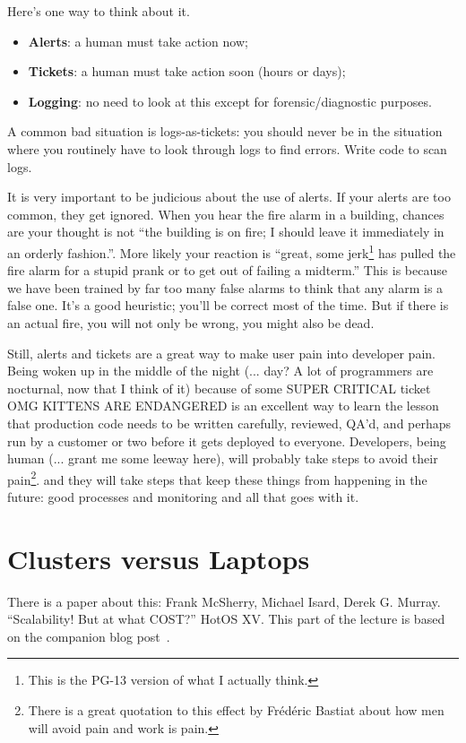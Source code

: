 \documentclass[a4paper]{report}
\begin{document}
Here's one way to think about it. 
\begin{itemize}
\item {\bf Alerts}: a human must take action now;
\item {\bf Tickets}: a human must take action soon (hours or days);
\item {\bf Logging}: no need to look at this except for forensic/diagnostic purposes.
\end{itemize}
A common bad situation is logs-as-tickets: you should never be in the
situation where you routinely have to look through logs to find
errors. Write code to scan logs.

It is very important to be judicious about the use of alerts. If your alerts are too common, they get ignored. When you hear the fire alarm in a building, chances are your thought is not ``the building is on fire; I should leave it immediately in an orderly fashion.''. More likely your reaction is ``great, some jerk\footnote{This is the PG-13 version of what I actually think.} has pulled the fire alarm for a stupid prank or to get out of failing a midterm.'' This is because we have been trained by far too many false alarms to think that any alarm is a false one. It's a good heuristic; you'll be correct most of the time. But if there is an actual fire, you will not only be wrong, you might also be dead.

Still, alerts and tickets are a great way to make user pain into developer pain. Being woken up in the middle of the night (... day? A lot of programmers are nocturnal, now that I think of it) because of some SUPER CRITICAL ticket OMG KITTENS ARE ENDANGERED is an excellent way to learn the lesson that production code needs to be written carefully, reviewed, QA'd, and perhaps run by a customer or two before it gets deployed to everyone. Developers, being human (... grant me some leeway here), will probably take steps to avoid their pain\footnote{There is a great quotation to this effect by Fr\'ed\'eric Bastiat about how men will avoid pain and work is pain.}. and they will take steps that keep these things from happening in the future: good processes and monitoring and all that goes with it.

\section*{Clusters versus Laptops}
There is a paper about this: Frank McSherry, Michael Isard, Derek G. Murray. ``Scalability! But at what COST?'' HotOS XV. This part of the lecture is based on the companion blog post~\cite{scalecost}.
\end{document}
